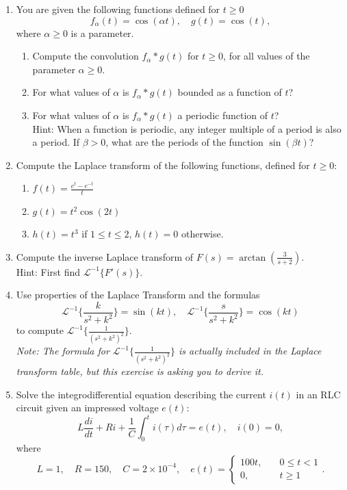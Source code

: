 \documentclass[11 pt]{article}
\newcommand{\calL}{\mathcal{L}}
\renewcommand{\a}{\alpha}
\renewcommand{\b}{\beta}
\renewcommand{\t}{\tau}
\begin{document}
\begin{enumerate}
\item  You are given the following functions defined for $t\geq 0 $
\begin{equation}
    f_\a(t)=\cos(\a t),\quad g(t)=\cos( t),
\end{equation}
where $\a\geq 0$ is a parameter.  
\begin{enumerate}
    \item Compute the convolution $f_\a*g(t)$ for $t\geq 0$, for all values of the parameter $\a\geq  0$.
    \item For what values of $\a$ is $f_\a*g(t)$ bounded as a function of $t$?
    \item For what values of $\a$ is $f_\a*g(t)$ a periodic function of $t$? \\
Hint: When a function is periodic, any integer multiple of a period is also a period. If $\b>0$, what are the periods of the function $\sin(\b t)$?
\end{enumerate}


\item Compute the Laplace transform of the following functions, defined for $t\geq 0$:
\begin{enumerate}
     \item $\displaystyle f(t)=\frac{e^t-e^{-t}}{t}$ 

     \item $g(t)=t^2\cos(2t)$
     \item $h(t)=t^3$ if $1\leq t\leq 2$, $h(t)=0$ otherwise.
 \end{enumerate} 

\item Compute the inverse Laplace transform of $F(s)=\arctan \left(\frac{3}{s+2}\right)$. \\
Hint: First find $\calL^{-1}\{F'(s)\}$.



\item Use properties of the Laplace Transform and the formulas
 $$\calL^{-1}\Big\{\frac{k}{s^2+k^2}\Big\}=\sin(kt),\quad  \calL^{-1}\Big\{\frac{s}{s^2+k^2}\Big\}=\cos(kt)$$ to compute $ \calL^{-1}\Big\{ \frac{1}{(s^2+k^2)^2}\Big\}$.\\
 \textit{Note: The formula for $ \calL^{-1}\Big\{ \frac{1}{(s^2+k^2)^2}\Big\}$ is actually included in the Laplace transform table, but this exercise is asking you to derive it.}



\item Solve the integrodifferential equation describing the current $i(t)$ in an RLC circuit given an impressed voltage $e(t):$
\begin{equation}
    L\frac{di}{dt}+R i+\frac{1}{C}\int_0^t i(\t)d\t =e(t), \quad i(0)=0,
\end{equation}
where
\begin{equation}
    L=1,\quad R=150,\quad C=2\times 10^{-4}, \quad  e(t)=\begin{cases}
        100t, \quad & 0\leq t<1\\
        0, \quad & t\geq 1
    \end{cases}.
\end{equation}




\end{enumerate}
\end{document}
